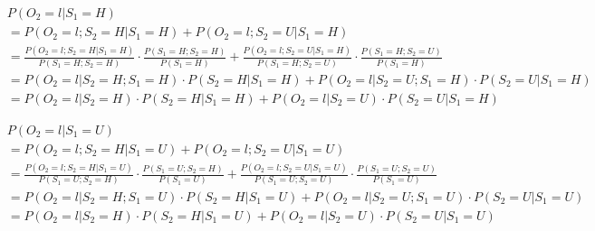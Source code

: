 \documentclass[paper=a4, fontsize=11pt]{scrartcl} %
\numberwithin{equation}{section} %
\numberwithin{figure}{section} %
\numberwithin{table}{section} %
\begin{document}
\begin{align*}
&P\left ( O_{2}=l | S_{1}=H \right )
\\&=P\left (O_{2}=l; S_{2}=H | S_{1}=H\right) + P\left(O_{2}=l; S_{2}=U | S_{1}=H\right)
\\&=\frac{P\left ( O_{2}=l;S_{2}=H | S_{1}=H \right )}{P\left ( S_{1}=H;S_{2}=H \right )}\cdot \frac{P\left ( S_{1}=H;S_{2}=H \right )}{P\left (S_{1}=H \right )} + \frac{P\left ( O_{2}=l;S_{2}=U | S_{1}=H \right )}{P\left ( S_{1}=H;S_{2}=U \right )}\cdot \frac{P\left ( S_{1}=H;S_{2}=U \right )}{P\left (S_{1}=H \right )}
\\&=P\left ( O_{2}=l | S_{2}=H ;S_{1}=H\right )\cdot P\left ( S_{2}=H |S_{1}=H\right ) + P\left ( O_{2}=l | S_{2}=U ;S_{1}=H\right )\cdot P\left ( S_{2}=U |S_{1}=H\right )
\\&=P\left ( O_{2}=l | S_{2}=H \right)\cdot P\left ( S_{2}=H |S_{1}=H\right ) + P\left ( O_{2}=l | S_{2}=U\right )\cdot P\left ( S_{2}=U |S_{1}=H\right )
\end{align*}

\begin{align*}
&P\left ( O_{2}=l | S_{1}=U \right )
\\&=P\left (O_{2}=l; S_{2}=H | S_{1}=U\right) + P\left(O_{2}=l; S_{2}=U | S_{1}=U\right)
\\&=\frac{P\left ( O_{2}=l;S_{2}=H | S_{1}=U \right )}{P\left ( S_{1}=U;S_{2}=H \right )}\cdot \frac{P\left ( S_{1}=U;S_{2}=H \right )}{P\left (S_{1}=U \right )} + \frac{P\left ( O_{2}=l;S_{2}=U | S_{1}=U \right )}{P\left ( S_{1}=U;S_{2}=U \right )}\cdot \frac{P\left ( S_{1}=U;S_{2}=U \right )}{P\left (S_{1}=U \right )}
\\&=P\left ( O_{2}=l | S_{2}=H ;S_{1}=U\right )\cdot P\left ( S_{2}=H |S_{1}=U\right ) + P\left ( O_{2}=l | S_{2}=U ;S_{1}=U\right )\cdot P\left ( S_{2}=U |S_{1}=U\right )
\\&=P\left ( O_{2}=l | S_{2}=H \right)\cdot P\left ( S_{2}=H |S_{1}=U\right ) + P\left ( O_{2}=l | S_{2}=U\right )\cdot P\left ( S_{2}=U |S_{1}=U\right )
\end{align*}
\end{document}
